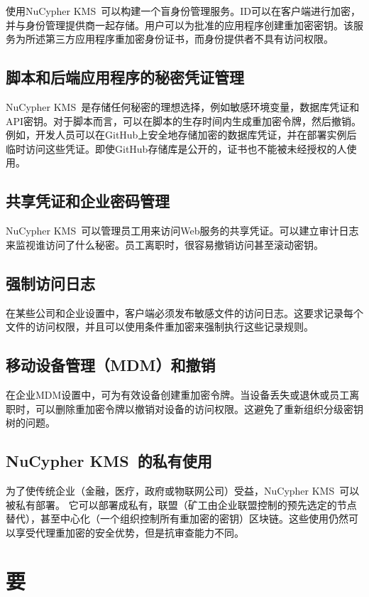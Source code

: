\documentclass[longbibliography,nofootinbib]{revtex4-1}
\newcommand{\kms}{NuCypher KMS}
\begin{document}
\begin{CJK*}{UTF8}{gbsn}
    使用\kms~可以构建一个盲身份管理服务。ID可以在客户端进行加密，并与身份管理提供商一起存储。用户可以为批准的应用程序创建重加密密钥。该服务为所述第三方应用程序重加密身份证书，而身份提供者不具有访问权限。

\subsection{脚本和后端应用程序的秘密凭证管理}

	\kms~是存储任何秘密的理想选择，例如敏感环境变量，数据库凭证和API密钥。对于脚本而言，可以在脚本的生存时间内生成重加密令牌，然后撤销。例如，开发人员可以在GitHub上安全地存储加密的数据库凭证，并在部署实例后临时访问这些凭证。即使GitHub存储库是公开的，证书也不能被未经授权的人使用。

\subsection{共享凭证和企业密码管理}
	\kms~可以管理员工用来访问Web服务的共享凭证。可以建立审计日志来监视谁访问了什么秘密。员工离职时，很容易撤销访问甚至滚动密钥。

\subsection{强制访问日志}

	在某些公司和企业设置中，客户端必须发布敏感文件的访问日志。这要求记录每个文件的访问权限，并且可以使用条件重加密来强制执行这些记录规则。

\subsection{移动设备管理（MDM）和撤销}
\label{sec:mdm}

    在企业MDM设置中，可为有效设备创建重加密令牌。当设备丢失或退休或员工离职时，可以删除重加密令牌以撤销对设备的访问权限。这避免了重新组织分级密钥树的问题。

\subsection{\kms~的私有使用}

	为了使传统企业（金融，医疗，政府或物联网公司）受益，\kms~可以被私有部署。 它可以部署成私有，联盟（矿工由企业联盟控制的预先选定的节点替代），甚至中心化（一个组织控制所有重加密的密钥）区块链。这些使用仍然可以享受代理重加密的安全优势，但是抗审查能力不同。

\section{要}
	

\end{CJK*}
\end{document}
